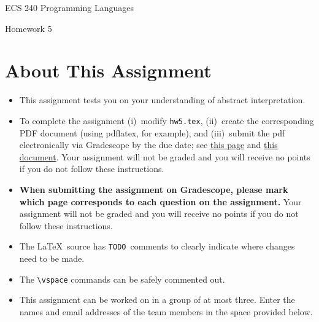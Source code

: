\documentclass[12pt]{article}
\begin{document}
    
    \begin{center}
        \bigskip
        {\LARGE ECS 240 Programming Languages} \medskip
                
        {\Large Homework 5} \bigskip
    
    \end{center}
    
    \section*{About This Assignment}
    
    \begin{itemize}
        \item This assignment tests you on your understanding of abstract interpretation.
        \item To complete the assignment 
        (i)~modify \texttt{hw5.tex}, 
        (ii)~create the corresponding PDF document (using pdflatex, for example), and 
        (iii)~submit the pdf electronically via Gradescope by the due date; 
        see \href{https://www.gradescope.com/get_started#student-submission}{this page} and
        \href{http://gradescope-static-assets.s3-us-west-2.amazonaws.com/help/submitting_hw_guide.pdf}{this document}.
        Your assignment will not be graded and you will receive
        no points if you do not follow these instructions. 
  \item \textbf{When submitting the assignment on Gradescope, please mark which page
    corresponds to each question on the assignment.} Your assignment will not be graded and you will receive
    no points if you do not follow these instructions. 
  \item The \LaTeX\ source has \texttt{TODO}~comments to clearly
    indicate where changes need to be made. 
  \item The \verb=\vspace= commands can be safely commented out.
  \item This assignment can be worked on in a group of at most three. Enter
  the names and email addresses of the team members in the space provided
  below.
\end{itemize}
\end{document}
